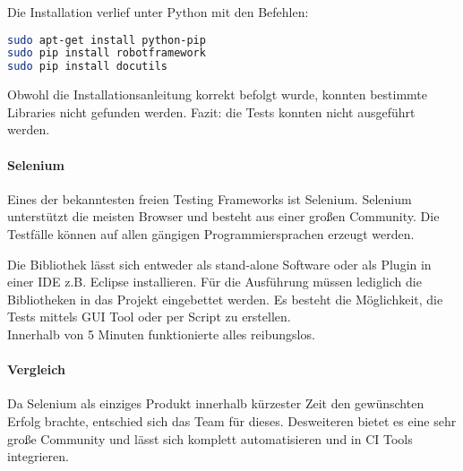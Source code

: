Die Installation verlief unter Python mit den Befehlen:
\begin{lstlisting}[caption={Installation von Robot Framework \cite{ROBOTFRAMEWORKINSTALL}}, language=bash]
sudo apt-get install python-pip
sudo pip install robotframework
sudo pip install docutils
\end{lstlisting}

Obwohl die Installationsanleitung korrekt befolgt wurde, konnten bestimmte Libraries nicht gefunden werden. Fazit: die Tests konnten nicht ausgeführt werden. 
\paragraph{Selenium}
Eines der bekanntesten freien Testing Frameworks ist Selenium. Selenium unterstützt die meisten Browser und besteht aus einer großen Community. Die Testfälle können auf allen gängigen Programmiersprachen erzeugt werden.

Die Bibliothek lässt sich entweder als stand-alone Software oder als Plugin in einer IDE z.B. Eclipse installieren. Für die Ausführung müssen lediglich die Bibliotheken in das Projekt eingebettet werden. Es besteht die Möglichkeit, die Tests mittels GUI Tool oder per Script zu erstellen.\\
Innerhalb von 5 Minuten funktionierte alles reibungslos.

\paragraph{Vergleich}
Da Selenium als einziges Produkt innerhalb kürzester Zeit den gewünschten Erfolg brachte, entschied sich das Team für dieses. Desweiteren bietet es eine sehr große Community und lässt sich komplett automatisieren und in CI Tools integrieren.